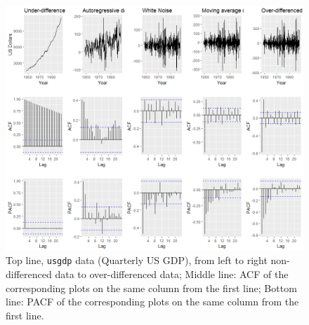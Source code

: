 \documentclass[12pt,a4paper,titlepage]{report}
\begin{document}
\begin{figure}[h]
    \centering
    \includegraphics[width=1\textwidth]{darmadynamics2}
    \caption{Top line, \texttt{usgdp} data (Quarterly US GDP), from left to right non-differenced data to over-differenced data; Middle line: ACF of the corresponding plots on the same column from the first line; Bottom line: PACF of the corresponding plots on the same column from the first line.}
    \label{armadynamics}
\end{figure}
\end{document}
